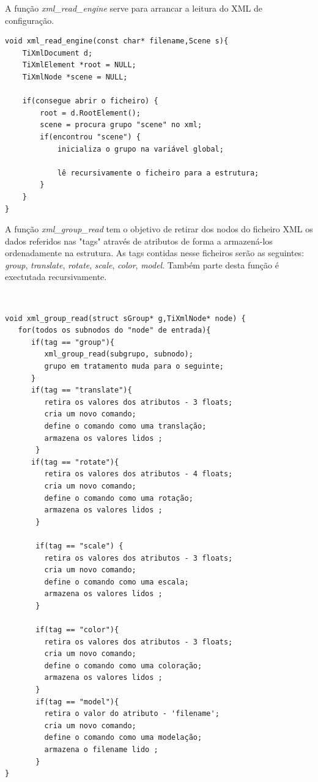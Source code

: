 A função \textit{xml\_read\_engine} serve para arrancar a leitura do XML de configuração.  
\begin{verbatim}
void xml_read_engine(const char* filename,Scene s){
    TiXmlDocument d;
    TiXmlElement *root = NULL;
    TiXmlNode *scene = NULL;

    if(consegue abrir o ficheiro) {
        root = d.RootElement();
        scene = procura grupo "scene" no xml;
        if(encontrou "scene") {
            inicializa o grupo na variável global; 
		
            lê recursivamente o ficheiro para a estrutura; 
        }
    }
}
\end{verbatim}


A função \textit{xml\_group\_read} tem o objetivo de retirar dos nodos do ficheiro XML os dados referidos nas "tags" através de atributos de forma a armazená-los ordenadamente na estrutura. As tags contidas nesse ficheiros serão as seguintes: \textit{group}, \textit{translate}, \textit{rotate}, \textit{scale}, \textit{color},  \textit{model}. Também parte desta função é exectutada recursivamente. 

\
\begin{Verbatim}
void xml_group_read(struct sGroup* g,TiXmlNode* node) {
   for(todos os subnodos do "node" de entrada){
      if(tag == "group"){
         xml_group_read(subgrupo, subnodo);
         grupo em tratamento muda para o seguinte;
      }
      if(tag == "translate"){
         retira os valores dos atributos - 3 floats; 
         cria um novo comando; 
         define o comando como uma translação;
         armazena os valores lidos ;
       }
      if(tag == "rotate"){
         retira os valores dos atributos - 4 floats; 
         cria um novo comando; 
         define o comando como uma rotação;
         armazena os valores lidos ;
       }   
       
       if(tag == "scale") {
         retira os valores dos atributos - 3 floats; 
         cria um novo comando; 
         define o comando como uma escala;
         armazena os valores lidos ;
       }
       
       if(tag == "color"){
         retira os valores dos atributos - 3 floats; 
         cria um novo comando; 
         define o comando como uma coloração;
         armazena os valores lidos ;
       }
       if(tag == "model"){
         retira o valor do atributo - 'filename'; 
         cria um novo comando; 
         define o comando como uma modelação;
         armazena o filename lido ;
       }
}
\end{Verbatim}



